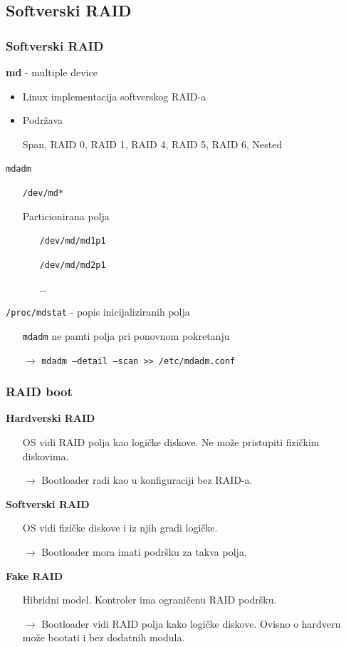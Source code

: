 \documentclass[t]{beamer}
\begin{document}
\subsection{Softverski RAID}
\begin{frame}
	\frametitle{Softverski RAID}
	\textbf{md} - multiple device
	\begin{itemize}
		\item Linux implementacija softverskog RAID-a
		\item Podržava
		\item[] Span, RAID 0, RAID 1, RAID 4, RAID 5, RAID 6, Nested
	\end{itemize}

	\texttt{mdadm}
	\begin{itemize}
		\item[] \texttt{/dev/md*}
		\item[] Particionirana polja
		\begin{itemize}
			\item[] \texttt{/dev/md/md1p1}
			\item[] \texttt{/dev/md/md2p1}
			\item[] \dots
		\end{itemize}
	\end{itemize}
	
	\texttt{/proc/mdstat} - popis inicijaliziranih polja\\
	\begin{itemize}
		\item[] \texttt{mdadm} ne pamti polja pri ponovnom pokretanju
		\item[$\rightarrow$] \texttt{mdadm --detail --scan >> /etc/mdadm.conf}
	\end{itemize}
\end{frame}

\begin{frame}
	\frametitle{RAID boot}
	\textbf{Hardverski RAID}
	\begin{itemize}
		\item[] OS vidi RAID polja kao logičke diskove. Ne može pristupiti fizičkim diskovima.
		\item[$\rightarrow$] Bootloader radi kao u konfiguraciji bez RAID-a.
	\end{itemize}
	\vfill
	\textbf{Softverski RAID}
	\begin{itemize}
		\item[] OS vidi fizičke diskove i iz njih gradi logičke.
		\item[$\rightarrow$] Bootloader mora imati podršku za takva polja.
	\end{itemize}
	\vfill
	\textbf{Fake RAID}
	\begin{itemize}
		\item[] Hibridni model. Kontroler ima ograničenu RAID podršku.
		\item[$\rightarrow$] Bootloader vidi RAID polja kako logičke diskove. Ovisno o hardveru može bootati i bez dodatnih modula.
	\end{itemize}
\end{frame}
\end{document}
